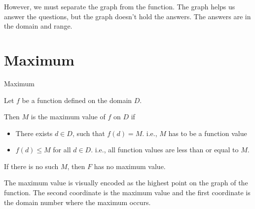 \documentclass{ximera}
\begin{document}
However, we must separate the graph from the function.  The graph helps us answer the questions, but the graph doesn't hold the answers.  The answers are in the domain and range. 





\section{Maximum}



\begin{definition} Maximum


Let $f$ be a function defined on the domain $D$.

Then $M$ is the maximum value of $f$ on $D$ if    


\begin{itemize}
\item There exists $d \in D$, such that $f(d) = M$.   i.e., $M$ has to be a function value \\

\item $f(d) \leq M$ for all $d \in D$. i.e., all function values are less than or equal to $M$. 

\end{itemize}


If there is no such $M$, then $F$ has no maximum value.

\end{definition}



\begin{observation}
The maximum value is visually encoded as the highest point on the graph of the function.  The second coordinate is the maximum value and the first coordinate is the domain number where the maximum occurs.
\end{observation}
\end{document}
